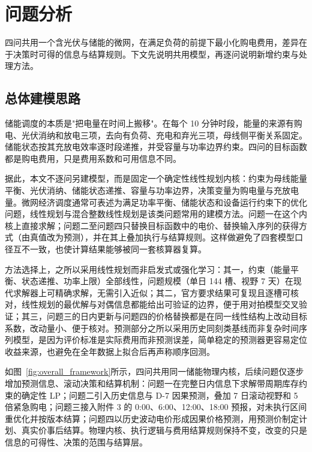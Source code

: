 \documentclass[withoutpreface,bwprint]{cumcmthesis}
\begin{document}
\section{问题分析}

四问共用一个含光伏与储能的微网，在满足负荷的前提下最小化购电费用，差异在于决策时可得的信息与结算规则。下文先说明共用模型，再逐问说明新增约束与处理方法。

\subsection{总体建模思路}

储能调度的本质是"把电量在时间上搬移"。在每个 10 分钟时段，能量的来源有购电、光伏消纳和放电三项，去向有负荷、充电和弃光三项，母线侧平衡关系固定。储能状态按其充放电效率逐时段递推，并受容量与功率边界约束。四问的目标函数都是购电费用，只是费用系数和可用信息不同。

据此，本文不逐问另建模型，而是固定一个确定性线性规划内核：约束为母线能量平衡、光伏消纳、储能状态递推、容量与功率边界，决策变量为购电量与充放电量。微网经济调度通常可表述为满足功率平衡、储能状态和设备运行约束下的优化问题，线性规划与混合整数线性规划是该类问题常用的建模方法\cite{boyd2004convex,si2011modeling}。问题一在这个内核上直接求解；问题二至问题四只替换目标函数中的电价、替换输入序列的获得方式（由真值改为预测），并在其上叠加执行与结算规则。这样做避免了四套模型口径互不一致，也使计算结果能够被同一套核算器复算。

方法选择上，之所以采用线性规划而非启发式或强化学习：其一，约束（能量平衡、状态递推、功率上限）全部线性，问题规模（单日 144 槽、视野 7 天）在现代求解器上可精确求解，无需引入近似；其二，官方要求结果可复现且逐槽可核对，线性规划的最优解与对偶信息都能给出可验证的边界，便于用对拍模型交叉验证；其三，问题三的日内更新与问题四的价格替换都是在同一线性结构上改动目标系数，改动量小、便于核对。预测部分之所以采用历史同刻类基线而非复杂时间序列模型，是因为评价标准是实际费用而非预测误差，简单稳定的预测器更容易定位收益来源，也避免在全年数据上拟合后再声称顺序回测。

如图~\ref{fig:overall_framework}所示，四问共用同一储能物理内核，后续问题仅逐步增加预测信息、滚动决策和结算机制：问题一在完整日内信息下求解带周期库存约束的确定性 LP；问题二引入历史信息与 D-7 因果预测，叠加 7 日滚动视野和 5 倍紧急购电；问题三接入附件 3 的 0:00、6:00、12:00、18:00 预报，对未执行区间重优化并按版本结算；问题四以历史波动电价形成因果价格预测，用预测价制定计划、真实价事后结算。物理内核、执行逻辑与费用结算规则保持不变，改变的只是信息的可得性、决策的范围与结算层。
\end{document}
